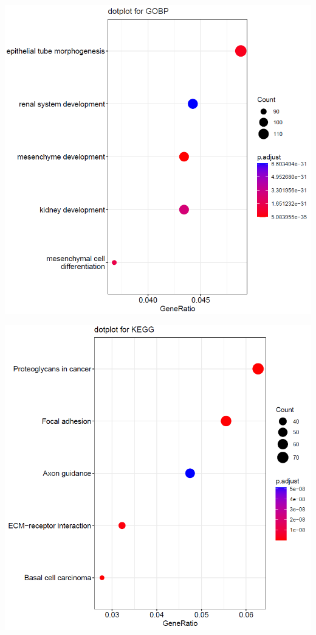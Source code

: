\documentclass[
  a4paper,
]{article}
\begin{document}
\includegraphics{assets/Snipaste_2022-10-25_23-45-22-20221025234524-qiue995.png}\hspace{0pt}

\includegraphics{assets/Snipaste_2022-10-25_23-45-53-20221025234555-akrjhuo.png}\hspace{0pt}
\end{document}
